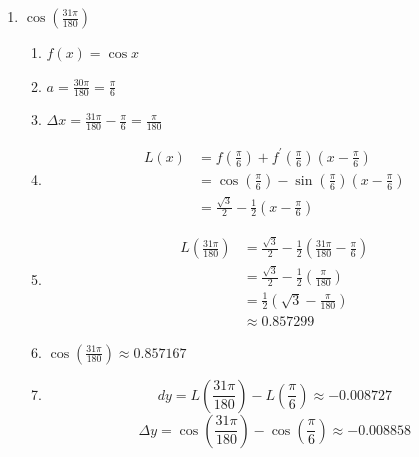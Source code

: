 \documentclass[nooutcomes,handout]{ximera}
\begin{document}
\begin{problem}
\begin{freeResponse}
\begin{enumerate}
	\item $ \cos \left( \frac{31 \pi}{180} \right)$
  \begin{enumerate}
    \item  $f(x) = \cos x$
    \item $a = \frac{30 \pi}{180} = \frac{\pi}{6}$
    \item  $\Delta x = \frac{31 \pi}{180} - \frac{\pi}{6} = \frac{\pi}{180}$
    \item
    \begin{align*}
      L(x) &= f\left( \frac{\pi}{6} \right) + f^\prime \left(\frac{\pi}{6} \right) \left( x - \frac{\pi}{6} \right) \\
           &= \cos \left( \frac{\pi}{6} \right) - \sin \left(\frac{\pi}{6} \right) \left( x - \frac{\pi}{6} \right) \\
           &= \frac{\sqrt{3}}{2} - \frac{1}{2} \left( x - \frac{\pi}{6} \right) 
    \end{align*}
    \item 
    \begin{align*}
      L \left( \frac{31 \pi}{180} \right) &= \frac{\sqrt{3}}{2} - \frac{1}{2} \left( \frac{31 \pi}{180} - \frac{\pi}{6} \right) \\
                                          &=  \frac{\sqrt{3}}{2} - \frac{1}{2} \left( \frac{\pi}{180} \right) \\
                                          &= \frac{1}{2} \left( \sqrt{3} - \frac{\pi}{180} \right) \\
                                          &\approx 0.857299
    \end{align*}
    \item  $\cos \left( \frac{31 \pi}{180} \right) \approx 0.857167$
    \item
      $$ dy = L\left( \frac{31\pi}{180} \right) - L \left( \frac{\pi}{6} \right) \approx -0.008727 $$
      $$ \Delta y = \cos \left( \frac{31 \pi}{180} \right) - \cos \left( \frac{\pi}{6} \right) \approx -0.008858 $$
  \end{enumerate}
  

\end{enumerate}
\end{freeResponse}
\end{problem}
\end{document}
